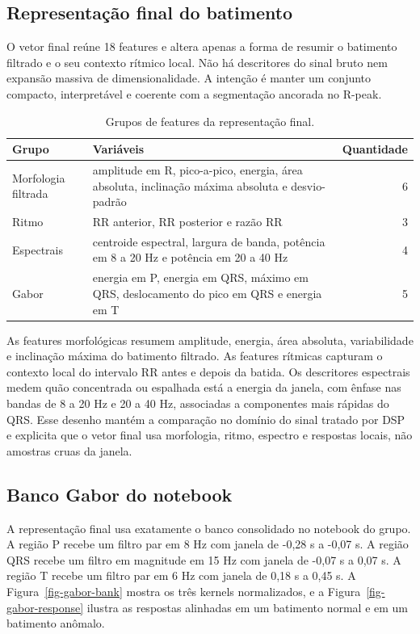 \subsection{Representação final do batimento}

O vetor final reúne 18 features e altera apenas a forma de resumir o batimento
filtrado e o seu contexto rítmico local. Não há descritores do sinal bruto nem
expansão massiva de dimensionalidade. A intenção é manter um conjunto compacto,
interpretável e coerente com a segmentação ancorada no R-peak.

\begin{table}[!htbp]
  \centering
  \caption{Grupos de features da representação final.}
  \label{tab-feature-groups}
  \scriptsize
  \renewcommand{\arraystretch}{1.08}
  \begin{tabular}{lp{8.6cm}r}
    \toprule
    Grupo & Variáveis & Quantidade \\
    \midrule
    Morfologia filtrada & amplitude em R, pico-a-pico, energia, área absoluta, inclinação máxima absoluta e desvio-padrão & 6 \\
    Ritmo & RR anterior, RR posterior e razão RR & 3 \\
    Espectrais & centroide espectral, largura de banda, potência em 8 a 20 Hz e potência em 20 a 40 Hz & 4 \\
    Gabor & energia em P, energia em QRS, máximo em QRS, deslocamento do pico em QRS e energia em T & 5 \\
    \bottomrule
  \end{tabular}
  \renewcommand{\arraystretch}{1.0}
\end{table}

As features morfológicas resumem amplitude, energia, área absoluta,
variabilidade e inclinação máxima do batimento filtrado. As features rítmicas
capturam o contexto local do intervalo RR antes e depois da batida. Os
descritores espectrais medem quão concentrada ou espalhada está a energia da
janela, com ênfase nas bandas de 8 a 20 Hz e 20 a 40 Hz, associadas a
componentes mais rápidas do QRS. Esse desenho mantém a comparação no domínio do
sinal tratado por DSP e explicita que o vetor final usa morfologia, ritmo,
espectro e respostas locais, não amostras cruas da janela.

\subsection{Banco Gabor do notebook}

A representação final usa exatamente o banco consolidado no notebook do grupo.
A região P recebe um filtro par em 8 Hz com janela de -0,28 s a -0,07 s. A
região QRS recebe um filtro em magnitude em 15 Hz com janela de -0,07 s a
0,07 s. A região T recebe um filtro par em 6 Hz com janela de 0,18 s a 0,45 s.
A Figura~\ref{fig-gabor-bank} mostra os três kernels normalizados, e a
Figura~\ref{fig-gabor-response} ilustra as respostas alinhadas em um batimento
normal e em um batimento anômalo.

